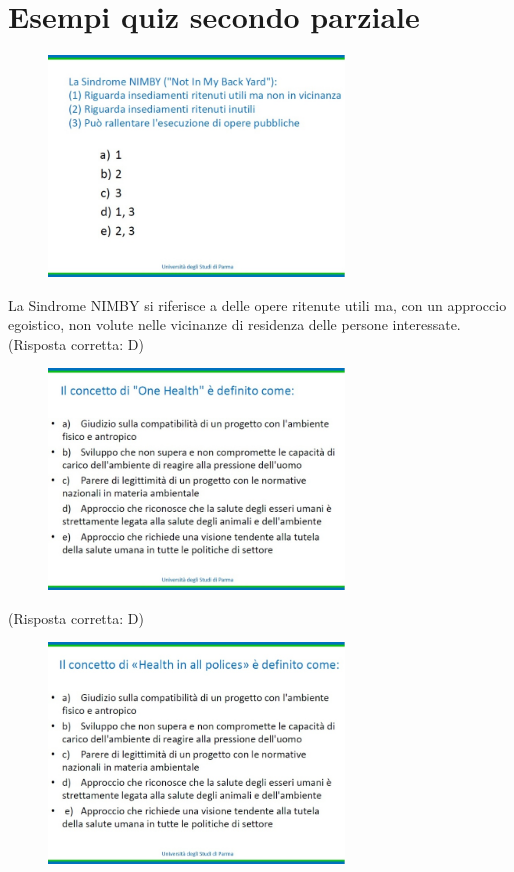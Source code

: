 \section{Esempi quiz secondo parziale}

\begin{figure}[!ht]
\centering
	\includegraphics[width=0.7\textwidth]{25/image1.jpeg}
	\end{figure}

La Sindrome NIMBY si riferisce a delle opere ritenute utili ma, con un
approccio egoistico, non volute nelle vicinanze di residenza delle
persone interessate. (Risposta corretta: D)

\begin{figure}[!ht]
\centering
	\includegraphics[width=0.7\textwidth]{25/image2.jpeg}
	\end{figure}

(Risposta corretta: D)

\begin{figure}[!ht]
\centering
	\includegraphics[width=0.7\textwidth]{25/image3.jpeg}
	\end{figure}

